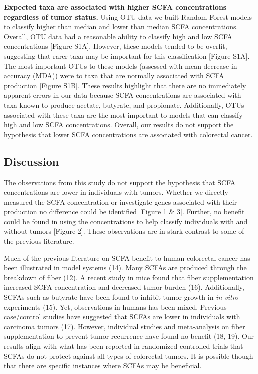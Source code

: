 \documentclass[11pt,]{article}
\begin{document}
\textbf{Expected taxa are associated with higher SCFA concentrations
regardless of tumor status.} Using OTU data we built Random Forest
models to classify higher than median and lower than median SCFA
concentrations. Overall, OTU data had a reasonable ability to classify
high and low SCFA concentrations {[}Figure S1A{]}. However, these models
tended to be overfit, suggesting that rarer taxa may be important for
this classification {[}Figure S1A{]}. The most important OTUs to these
models (assessed with mean decrease in accuracy (MDA)) were to taxa that
are normally associated with SCFA production {[}Figure S1B{]}. These
results highlight that there are no immediately apparent errors in our
data because SCFA concentrations are associated with taxa known to
produce acetate, butyrate, and propionate. Additionally, OTUs associated
with these taxa are the most important to models that can classify high
and low SCFA concentrations. Overall, our results do not support the
hypothesis that lower SCFA concentrations are associated with colorectal
cancer.

\newpage

\subsection{Discussion}\label{discussion}

The observations from this study do not support the hypothesis that SCFA
concentrations are lower in individuals with tumors. Whether we directly
measured the SCFA concentration or investigate genes associated with
their production no difference could be identified {[}Figure 1 \& 3{]}.
Further, no benefit could be found in using the concentrations to help
classify individuals with and without tumors {[}Figure 2{]}. These
observations are in stark contrast to some of the previous literature.

Much of the previous literature on SCFA benefit to human colorectal
cancer has been illustrated in model systems (14). Many SCFAs are
produced through the breakdown of fiber (12). A recent study in mice
found that fiber supplementation increased SCFA concentration and
decreased tumor burden (16). Additionally, SCFAs such as butyrate have
been found to inhibit tumor growth in \emph{in vitro} experiments (15).
Yet, observations in humans has been mixed. Previous case/control
studies have suggested that SCFAs are lower in individuals with
carcinoma tumors (17). However, individual studies and meta-analysis on
fiber supplementation to prevent tumor recurrence have found no benefit
(18, 19). Our results align with what has been reported in
randomized-controlled trials that SCFAs do not protect against all types
of colorectal tumors. It is possible though that there are specific
instances where SCFAs may be beneficial.
\end{document}
